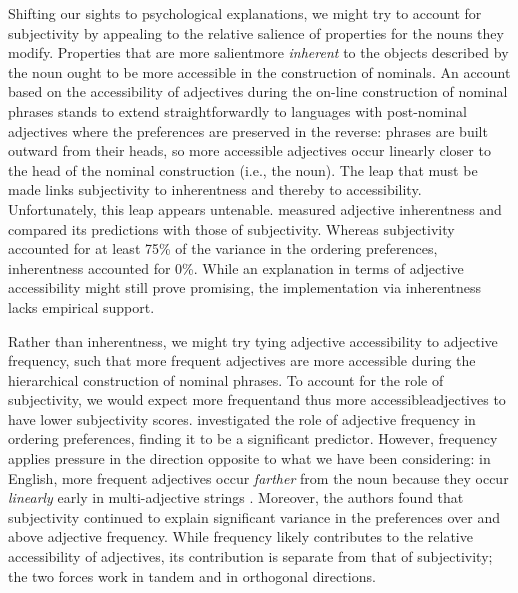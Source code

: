 \documentclass{sp}
\begin{document}
Shifting our sights to psychological explanations, we might try to account for subjectivity by appealing to the relative salience of properties for the nouns they modify. Properties that are more salient\dash more \emph{inherent} to the objects described by the noun \citep[e.g.,][]{whorf1945}\dash ought to be more accessible in the construction of nominals. An account based on the accessibility of adjectives during the on-line construction of nominal phrases stands to extend straightforwardly to languages with post-nominal adjectives where the preferences are preserved in the reverse: phrases are built outward from their heads, so more accessible adjectives occur linearly closer to the head of the nominal construction (i.e., the noun). The leap that must be made links subjectivity to inherentness and thereby to accessibility. Unfortunately, this leap appears untenable. \citeauthor{scontrasetal2017adjectives} measured adjective inherentness and compared its predictions with those of subjectivity. Whereas subjectivity accounted for at least 75\% of the variance in the ordering preferences, inherentness accounted for 0\%. While an explanation in terms of adjective accessibility might still prove promising, the implementation via inherentness lacks empirical support.

Rather than inherentness, we might try tying adjective accessibility to adjective frequency, such that more frequent adjectives are more accessible during the hierarchical construction of nominal phrases. To account for the role of subjectivity, we would expect more frequent\dash and thus more accessible\dash adjectives to have lower subjectivity scores. \citeauthor{scontrasetal2017adjectives} investigated the role of adjective frequency in ordering preferences, finding it to be a significant predictor. However, frequency applies pressure in the direction opposite to what we have been considering: in English, more frequent adjectives occur \emph{farther} from the noun because they occur \emph{linearly} early in multi-adjective strings \citep[cf.][]{wulff2003}. 
Moreover, the authors found that subjectivity continued to explain significant variance in the preferences over and above adjective frequency. While frequency likely contributes to the relative accessibility of adjectives, its contribution is separate from that of subjectivity; the two forces work in tandem and in orthogonal directions. 
\end{document}
